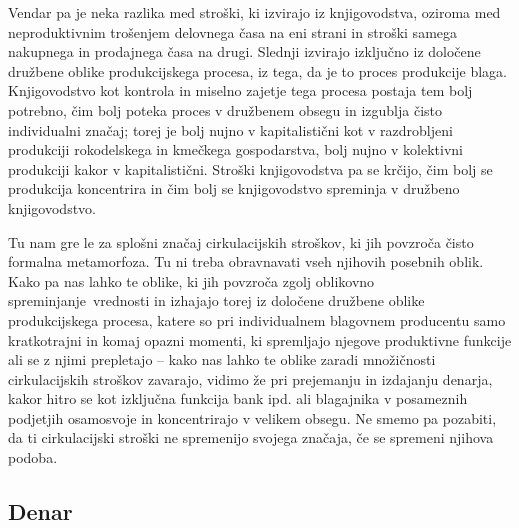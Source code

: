 \documentclass[kapital_02.tex]{subfiles}
\begin{document}
Vendar pa je neka razlika med stroški, ki izvirajo iz knjigovodstva, oziroma med neproduktivnim trošenjem delovnega časa na eni strani in stroški samega nakupnega in prodajnega časa na drugi.
Slednji izvirajo izključno iz določene družbene oblike produkcijskega procesa, iz tega, da je to proces produkcije blaga.
Knjigovodstvo kot kontrola in miselno zajetje tega procesa postaja tem bolj potrebno, čim bolj poteka proces v družbenem obsegu in izgublja čisto individualni značaj; torej je bolj nujno v kapitalistični kot v razdrobljeni produkciji rokodelskega in kmečkega gospodarstva, bolj nujno v kolektivni produkciji kakor v kapitalistični.
Stroški knjigovodstva pa se krčijo, čim bolj se produkcija koncentrira in čim bolj se knjigovodstvo spreminja v družbeno knjigovodstvo.

Tu nam gre le za splošni značaj cirkulacijskih stroškov, ki jih povzroča čisto formalna metamorfoza.
Tu ni treba obravnavati vseh njihovih posebnih oblik.
Kako pa nas lahko te oblike, ki jih povzroča zgolj oblikovno spreminjanje\KPEstran\ vrednosti in izhajajo torej iz določene družbene oblike produkcijskega procesa, katere so pri individualnem blagovnem producentu samo kratkotrajni in komaj opazni momenti, ki spremljajo njegove produktivne funkcije ali se z njimi prepletajo -- kako nas lahko te oblike zaradi množičnosti cirkulacijskih stroškov zavarajo, vidimo že pri prejemanju in izdajanju denarja, kakor hitro se kot izključna funkcija bank ipd. ali blagajnika v posameznih podjetjih osamosvoje in koncentrirajo v velikem obsegu.
Ne smemo pa pozabiti, da ti cirkulacijski stroški ne spremenijo svojega značaja, če se spremeni njihova podoba. 

\subsection{Denar}
\end{document}
